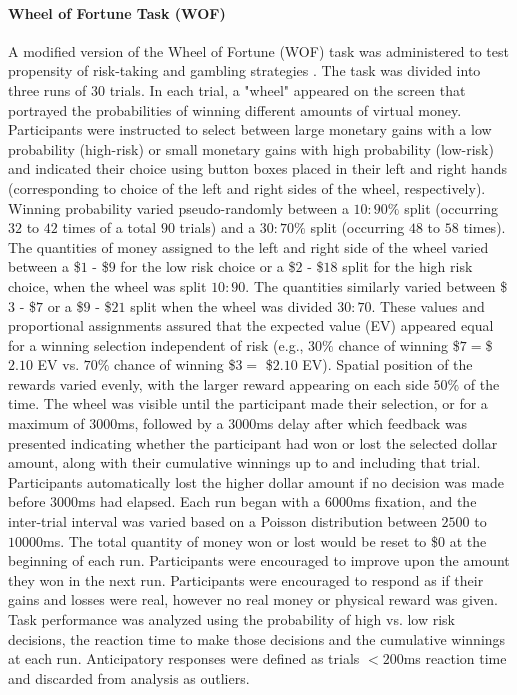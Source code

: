 \documentclass{article}%
\begin{document}
\paragraph*{Wheel of Fortune Task (WOF)} A modified version of the Wheel of Fortune (WOF) task was administered to test propensity of risk-taking and gambling strategies \citep{ernst2004wheeloffortune}. The task was divided into three runs of 30 trials. In each trial, a "wheel" appeared on the screen that portrayed the probabilities of winning different amounts of virtual money. Participants were instructed to select between large monetary gains with a low probability (high-risk) or small monetary gains with high probability (low-risk) and indicated their choice using button boxes placed in their left and right hands (corresponding to choice of the left and right sides of the wheel, respectively). Winning probability varied pseudo-randomly between a $10:90\%$ split (occurring $32$ to $42$ times of a total $90$ trials) and a $30:70\%$ split (occurring $48$ to $58$ times). The quantities of money assigned to the left and right side of the wheel varied between a \$$1$ - \$$9$ for the low risk choice or a \$$2$ - \$$18$ split for the high risk choice, when the wheel was split $10:90$. The quantities similarly varied between \$$3$ - \$$7$ or a \$$9$ - \$$21$ split when the wheel was divided $30:70$.  These values and proportional assignments assured that the expected value (EV) appeared equal for a winning selection independent of risk (e.g., $30\%$ chance of winning \$$7 = $\$$2.10$ EV vs. $70\%$ chance of winning \$$3 =$ \$$2.10$ EV).  Spatial position of the rewards varied evenly, with the larger reward appearing on each side $50\%$ of the time.  The wheel was visible until the participant made their selection, or for a maximum of $3000$ms, followed by a $3000$ms delay after which feedback was presented indicating whether the participant had won or lost the selected dollar amount, along with their cumulative winnings up to and including that trial.  Participants automatically lost the higher dollar amount if no decision was made before $3000$ms had elapsed.  Each run began with a $6000$ms fixation, and the inter-trial interval was varied based on a Poisson distribution between $2500$ to $10000$ms. The total quantity of money won or lost would be reset to \$$0$ at the beginning of each run. Participants were encouraged to improve upon the amount they won in the next run.  Participants were encouraged to respond as if their gains and losses were real, however no real money or physical reward was given. Task performance was analyzed using the probability of high vs. low risk decisions, the reaction time to make those decisions and the cumulative winnings at each run. Anticipatory responses were defined as trials $<200$ms reaction time and discarded from analysis as outliers.
\end{document}

